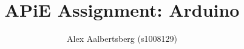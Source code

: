 \documentclass[12pt, a4paper]{article}
\begin{document}
	\author{Alex Aalbertsberg (s1008129)}
	\title{APiE Assignment: Arduino}
	
	\maketitle
	
	
	
	
	
	
	
	
	
	
	
	
	
	
	
	
	
\end{document}
